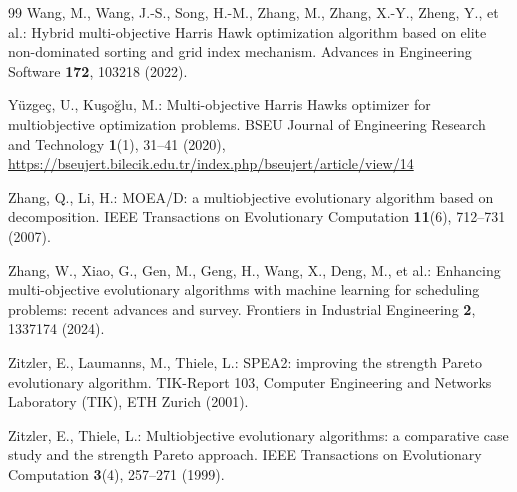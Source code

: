 \documentclass[runningheads]{llncs}
\begin{document}
\begin{thebibliography}{99}
Wang, M., Wang, J.-S., Song, H.-M., Zhang, M., Zhang, X.-Y., Zheng, Y., et al.: Hybrid multi-objective Harris Hawk optimization algorithm based on elite non-dominated sorting and grid index mechanism. Advances in Engineering Software \textbf{172}, 103218 (2022). 

Yüzgeç, U., Kuşoğlu, M.: Multi-objective Harris Hawks optimizer for multiobjective optimization problems. BSEU Journal of Engineering Research and Technology \textbf{1}(1), 31--41 (2020), \url{https://bseujert.bilecik.edu.tr/index.php/bseujert/article/view/14}

Zhang, Q., Li, H.: MOEA/D: a multiobjective evolutionary algorithm based on decomposition. IEEE Transactions on Evolutionary Computation \textbf{11}(6), 712--731 (2007). 

Zhang, W., Xiao, G., Gen, M., Geng, H., Wang, X., Deng, M., et al.: Enhancing multi-objective evolutionary algorithms with machine learning for scheduling problems: recent advances and survey. Frontiers in Industrial Engineering \textbf{2}, 1337174 (2024). 

Zitzler, E., Laumanns, M., Thiele, L.: SPEA2: improving the strength Pareto evolutionary algorithm. TIK-Report 103, Computer Engineering and Networks Laboratory (TIK), ETH Zurich (2001). 

Zitzler, E., Thiele, L.: Multiobjective evolutionary algorithms: a comparative case study and the strength Pareto approach. IEEE Transactions on Evolutionary Computation \textbf{3}(4), 257--271 (1999). 

\end{thebibliography}
\end{document}
